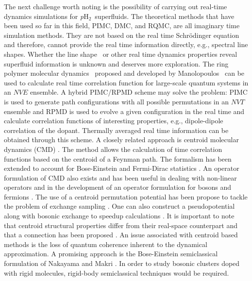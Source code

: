 \documentclass[12pt]{iopart}
\newcommand{\phtwo}{{\em p}H$_2$}
\begin{document}
The next challenge worth noting is the possibility of carrying out real-time dynamics simulations for \phtwo~superfluids. 
The theoretical methods that have been used so far in this field, PIMC, DMC, and RQMC, are all imaginary time simulation methods. 
They are not based on the real time Schr\"odinger equation and therefore, cannot provide the real time information directly, e.g., spectral line shapes. 
Whether the line shape~\cite{ravi_ch4_he,raston_hocl_he} or other real time dynamics properties reveal superfluid information is
  unknown and deserves more exploration. 
 The ring polymer molecular dynamics~\cite{craig_rpmd1,braams_rpmd_shorttime,habershon_rpmd_correlation,habershon_rpmd_arpc} proposed and developed by Manolopoulos \etal~can be used to calculate real time correlation function for large-scale quantum systems in an $NVE$ ensemble. A hybrid PIMC/RPMD scheme may solve the problem: PIMC is used to generate path configurations with all possible permutations in an $NVT$ ensemble and RPMD is used to evolve a given configuration in the real time and calculate correlation functions of interesting properties, e.g., dipole-dipole correlation of the dopant. Thermally averaged real time information can be obtained through this scheme.
A closely related approach is centroid molecular dynamics (CMD) \cite{cao94II,voth96}. The method allows the calculation of time correlation functions based on the centroid of a Feynman path. The formalism has been extended to account for Bose-Einstein and Fermi-Dirac statistics  \cite{roy99I,roy99II}. An operator formulation of CMD also exists \cite{jang99I,jang99II} and has been useful
in dealing with non-linear operators \cite{reichman2000} and in the development of an operator formulation for bosons and fermions \cite{nb2001I,nb2001II,moffatt2004}.
The use of a centroid permutation potential has been propose to tackle the problem of exchange sampling \cite{kinugawa99,kinugawa2001,nb2002I}.
One can also construct a pseudopotential along with bosonic exchange to speedup calculations \cite{nb2002II}.
It is important to note that centroid structural properties  differ from their real-space counterpart and that a connection has been proposed \cite{blinov:3759}.
An issue associated with centroid based methods is the loss of quantum coherence inherent to the dynamical approximation.
A promising approach is the Bose-Einstein semiclassical formulation of Nakayama and Makri  \cite{Nakayama22032005}.
In order to study bosonic clusters doped with rigid molecules, rigid-body semiclassical techniques \cite{bilkiss_trimers_jcp_123_84103,bilkiss_excitedtrimers_jcp_126_024111,bilkiss_fullSCwater_jcp_127_054105,bilkiss_TA_SCIVR_H2O_jcp_127_144306} would be required.
\end{document}
